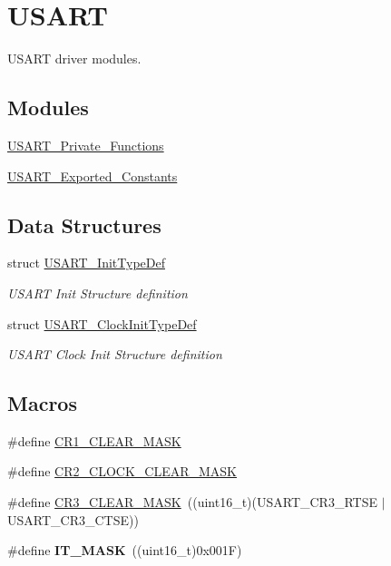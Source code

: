 \hypertarget{group___u_s_a_r_t}{}\section{U\+S\+A\+RT}
\label{group___u_s_a_r_t}


U\+S\+A\+RT driver modules.  


\subsection*{Modules}
\begin{DoxyCompactItemize}
\item 
\mbox{\hyperlink{group___u_s_a_r_t___private___functions}{U\+S\+A\+R\+T\+\_\+\+Private\+\_\+\+Functions}}
\item 
\mbox{\hyperlink{group___u_s_a_r_t___exported___constants}{U\+S\+A\+R\+T\+\_\+\+Exported\+\_\+\+Constants}}
\end{DoxyCompactItemize}
\subsection*{Data Structures}
\begin{DoxyCompactItemize}
\item 
struct \mbox{\hyperlink{struct_u_s_a_r_t___init_type_def}{U\+S\+A\+R\+T\+\_\+\+Init\+Type\+Def}}
\begin{DoxyCompactList}\small\item\em U\+S\+A\+RT Init Structure definition ~\newline
 \end{DoxyCompactList}\item 
struct \mbox{\hyperlink{struct_u_s_a_r_t___clock_init_type_def}{U\+S\+A\+R\+T\+\_\+\+Clock\+Init\+Type\+Def}}
\begin{DoxyCompactList}\small\item\em U\+S\+A\+RT Clock Init Structure definition ~\newline
 \end{DoxyCompactList}\end{DoxyCompactItemize}
\subsection*{Macros}
\begin{DoxyCompactItemize}
\item 
\#define \mbox{\hyperlink{group___u_s_a_r_t_ga8d425258898b4af4ebc820f52635fad8}{C\+R1\+\_\+\+C\+L\+E\+A\+R\+\_\+\+M\+A\+SK}}
\item 
\#define \mbox{\hyperlink{group___u_s_a_r_t_ga7834b3d9be4875de242f87c12fd79f02}{C\+R2\+\_\+\+C\+L\+O\+C\+K\+\_\+\+C\+L\+E\+A\+R\+\_\+\+M\+A\+SK}}
\item 
\#define \mbox{\hyperlink{group___u_s_a_r_t_ga5c882571db73abc5d1837368a1cb0a64}{C\+R3\+\_\+\+C\+L\+E\+A\+R\+\_\+\+M\+A\+SK}}~((uint16\+\_\+t)(U\+S\+A\+R\+T\+\_\+\+C\+R3\+\_\+\+R\+T\+SE $\vert$ U\+S\+A\+R\+T\+\_\+\+C\+R3\+\_\+\+C\+T\+SE))
\item 
\mbox{\label{group___u_s_a_r_t_gacde7fc0e46b3a5fc7e2002b2915884d5}} 
\#define {\bfseries I\+T\+\_\+\+M\+A\+SK}~((uint16\+\_\+t)0x001\+F)
\end{DoxyCompactItemize}
